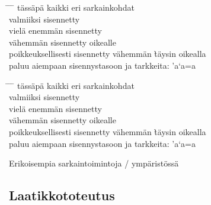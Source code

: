 \begin{esimerkki*}
  \komentoi{+}
  \komentoi{-}
  \komentoi{<}
  \komentoi{=}
  \komentoi{>}

\begin{koodilohko}
\setlength{\tabbingsep}{0mm}
\begin{tabbing}
  \hspace{23mm} \= \hspace{23mm} \= \hspace{23mm} \= \kill
  tässäpä \> kaikki \> eri \> sarkainkohdat \+ \\
  valmiiksi sisennetty \+ \\
  vielä enemmän sisennetty \- \\
  vähemmän sisennetty \>\> oikealle\' \\
  \< poikkeuksellisesti sisennetty vähemmän \` täysin oikealla \\
  paluu aiempaan sisennystasoon ja tarkkeita: \a'{a}\a`{a}\a={a}
\end{tabbing}
\end{koodilohko}

  \begin{tulos}
    \setlength{\tabbingsep}{0mm}
    \begin{tabbing}
      \hspace{23mm} \= \hspace{23mm} \= \hspace{23mm} \= \kill
      tässäpä \> kaikki \> eri \> sarkainkohdat \+ \\
      valmiiksi sisennetty \+ \\
      vielä enemmän sisennetty \- \\
      vähemmän sisennetty \>\> oikealle\' \\
      \< poikkeuksellisesti sisennetty vähemmän \` täysin oikealla \\
      paluu aiempaan sisennystasoon ja tarkkeita: \a'{a}\a`{a}\a={a}
    \end{tabbing}
  \end{tulos}

  \caption{Erikoisempia sarkaintoimintoja \-/
    ympäristössä}
  \label{esim/tabbing-erikois}
\end{esimerkki*}

\subsection{Laatikkototeutus}

